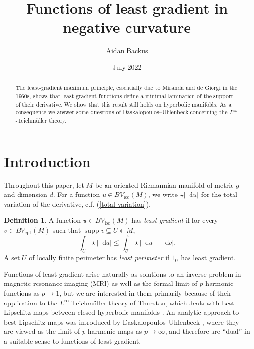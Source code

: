 \documentclass[reqno,12pt,letterpaper]{amsart}
\title{Functions of least gradient in negative curvature}
\author{Aidan Backus}
\date{July 2022}
\DeclareMathOperator{\supp}{supp}
\newcommand*\dif{\mathop{}\!\mathrm{d}}
\newcommand{\dfn}[1]{\emph{#1}\index{#1}}
\newcommand{\loc}{\mathrm{loc}}
\newcommand{\cpt}{\mathrm{cpt}}
\theoremstyle{definition}
\newtheorem{definition}[theorem]{Definition}
\numberwithin{equation}{section}
\begin{document}
\begin{abstract}
The least-gradient maximum principle, essentially due to Miranda and de Giorgi in the 1960s, shows that least-gradient functions define a minimal lamination of the support of their derivative.
We show that this result still holds on hyperbolic manifolds.
As a consequence we answer some questions of Daskalopoulos--Uhlenbeck concerning the $L^\infty$-Teichm\"uller theory.
\end{abstract}

\maketitle



\section{Introduction}
Throughout this paper, let $M$ be an oriented Riemannian manifold of metric $g$ and dimension $d$.
For a function $u \in BV_\loc(M)$, we write $\star |\dif u|$ for the total variation of the derivative, c.f. (\ref{total variation}).

\begin{definition}\label{main definitions}
A function $u \in BV_\loc(M)$ has \dfn{least gradient} if for every $v \in BV_\cpt(M)$ such that $\supp v \subseteq U \Subset M$,
$$\int_U \star |\dif u| \leq \int_U \star |\dif u + \dif v|.$$
A set $U$ of locally finite perimeter has \dfn{least perimeter} if $1_U$ has least gradient.
\end{definition}

Functions of least gradient arise naturally as solutions to an inverse problem in magnetic resonance imaging (MRI) \cite{Nachman2009, Tamasan2019, Joy09} as well as the formal limit of $p$-harmonic functions as $p \to 1$, but we are interested in them primarily because of their application to the $L^\infty$-Teichm\"uller theory of Thurston, which deals with best-Lipschitz maps between closed hyperbolic manifolds \cite{thurston1998minimal}.
An analytic approach to best-Lipschitz maps was introduced by Daskalopoulos--Uhlenbeck \cite{daskalopoulos2020transverse, daskalopoulosPrep1}, where they are viewed as the limit of $p$-harmonic maps as $p \to \infty$, and therefore are ``dual'' in a suitable sense to functions of least gradient.
\end{document}
